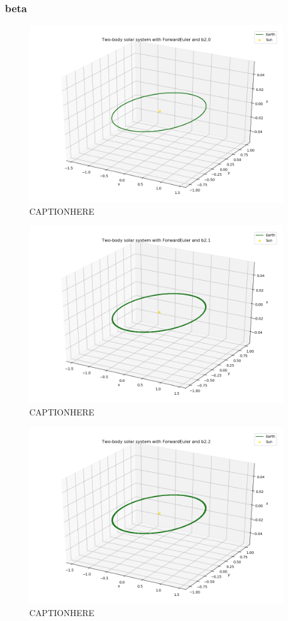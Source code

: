 \documentclass{article}
\begin{document}
\subsubsection{beta}

    \begin{figure}[H]
        \centering
        \includegraphics[width = 11cm]{img/plot3D_S_E_F_b20.png}
        \caption{CAPTIONHERE}
        \label{fig:plot3D_S_E_F_b20}
    \end{figure}

    \begin{figure}[H]
        \centering
        \includegraphics[width = 11cm]{img/plot3D_S_E_F_b21.png}
        \caption{CAPTIONHERE}
        \label{fig:plot3D_S_E_F_b21}
    \end{figure}

    \begin{figure}[H]
        \centering
        \includegraphics[width = 11cm]{img/plot3D_S_E_F_b22.png}
        \caption{CAPTIONHERE}
        \label{fig:plot3D_S_E_F_b22}
    \end{figure}
\end{document}
